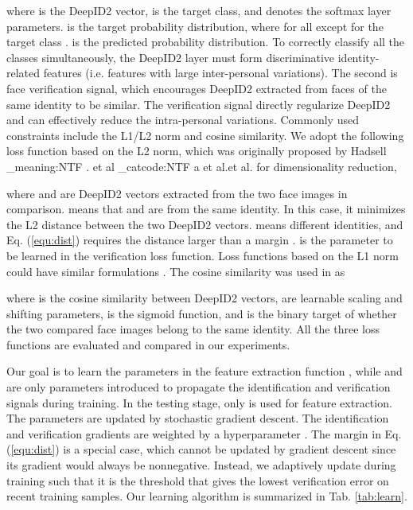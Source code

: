 \documentclass{article} \usepackage{nips14submit_e,times}
\makeatletter
\newcommand\latinabbrev[1]{
  \peek_meaning:NTF . {#1\@}{ \peek_catcode:NTF a {#1.\@ }{#1.\@}}}
\def\etal{\latinabbrev{et al}}
\makeatother
\begin{document}
where  is the DeepID2 vector,  is the target class, and  denotes the softmax layer parameters.  is the target probability distribution, where  for all  except  for the target class .  is the predicted probability distribution. To correctly classify all the classes simultaneously, the DeepID2 layer must form discriminative identity-related features (i.e. features with large inter-personal variations).
The second is face verification signal, which encourages DeepID2 extracted from faces of the same identity to be similar. The verification signal directly regularize DeepID2 and can effectively reduce the intra-personal variations. Commonly used constraints include the L1/L2 norm and cosine similarity. We adopt the following loss function based on the L2 norm, which was originally proposed by Hadsell \etal \cite{hadsell2006} for dimensionality reduction,



where  and  are DeepID2 vectors extracted from the two face images in comparison.  means that  and  are from the same identity. In this case, it minimizes the L2 distance between the two DeepID2 vectors.  means different identities, and Eq. (\ref{equ:dist}) requires the distance larger than a margin .  is the parameter to be learned in the verification loss function. Loss functions based on the L1 norm could have similar formulations \cite{mobahi2009}. The cosine similarity was used in \cite{nair2010} as



where  is the cosine similarity between DeepID2 vectors,  are learnable scaling and shifting parameters,  is the sigmoid function, and  is the binary target of whether the two compared face images belong to the same identity. All the three loss functions are evaluated and compared in our experiments.

Our goal is to learn the parameters  in the feature extraction function , while  and  are only parameters introduced to propagate the identification and verification signals during training. In the testing stage, only  is used for feature extraction. The parameters are updated by stochastic gradient descent. The identification and verification gradients are weighted by a hyperparameter . The margin  in Eq. (\ref{equ:dist}) is a special case, which cannot be updated by gradient descent since its gradient would always be nonnegative. Instead, we adaptively update  during training such that it is the threshold that gives the lowest verification error on recent training samples. Our learning algorithm is summarized in Tab. \ref{tab:learn}.
\end{document}
